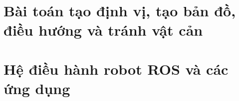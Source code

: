 \section{Bài toán tạo định vị, tạo bản đồ, điều hướng và tránh vật cản}

\section{Hệ điều hành robot ROS và các ứng dụng}


